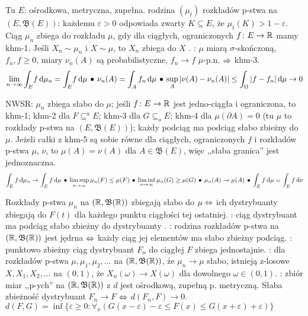 Tu  $E$: ośrodkowa, metryczna, zupełna.
 rodzina $(\mu_t)$ rozkładów p-stwa na $(E, \mathfrak B(E))$: każdemu $\varepsilon > 0$ odpowiada zwarty $K \subseteq E$, że $\mu_t(K) > 1 - \varepsilon$.
Ciąg $\mu_n$ zbiega  do rozkładu $\mu$, gdy dla ciągłych, ograniczonych $f \colon E \to \mathbb{R}$ mamy khm-1.
Jeśli $X_n \sim \mu_n$ i $X \sim \mu$, to $X_n$ zbiega do $X$ .
: $\mu$ miarą $\sigma$-skończoną, $f_n, f \ge 0$, miary $\nu_n (A)$ są probabilistyczne, $f_n \to f$ $\mu$-p.n. $\Rightarrow$ khm-3.
\[
	\lim_{n \to \infty} \int_E \! f \, \textrm{d} \mu_n = \int_E \! f \, \textrm{d} \mu \, \bullet \,
	\nu_n(A) = \int_A f_n \, \textrm{d} \mu \, \bullet \,
	\sup_A \left|\nu(A) - \nu_n(A)\right| \le \int_\Omega |f-f_n| \, \textrm{d} \mu \to 0
\]

NWSR:  $\mu_n$ zbiega słabo do $\mu$; jeśli $f \colon E \to \mathbb{R}$ jest jedno-ciągła i ograniczona, to khm-1; khm-2 dla $F \subseteq^a E$; khm-3 dla $G \subseteq_o E$; khm-4 dla $\mu (\partial A) = 0$ (tu $\mu$ to rozkłady p-stwa na $(E, \mathfrak B(E))$); każdy podciąg ma podciąg słabo zbieżny do $\mu$.
Jeżeli całki z khm-5 są sobie równe dla ciągłych, ograniczonych $f$ i rozkładów p-stwa $\mu$, $\nu$, to $\mu (A) = \nu (A)$ dla $A \in \mathfrak B(E)$, więc ,,słaba granica'' jest jednoznaczna.
\[
	\int_E f \, \textrm{d} \mu_n \to \int_E f \, \textrm{d} \mu \, \bullet \,
	\limsup_{n \to \infty} \mu_n (F) \le \mu (F) \, \bullet \,
	\liminf_{n \to \infty} \mu_n (G) \ge \mu (G) \, \bullet \,
	\mu_n(A) \to \mu(A)
	\, \bullet \, \int_E f \, \textrm{d} \mu = \int_E f \, \textrm{d} \nu
\]

Rozkłady  p-stwa $\mu_n$ na $(\mathbb{R}, \mathfrak B(\mathbb{R}))$ zbiegają słabo do $\mu \Leftrightarrow$ ich dystrybuanty zbiegają do $F(t)$ dla każdego punktu ciągłości tej ostatniej.
: ciąg dystrybuant ma podciąg słabo zbieżny do dystrybuanty .
: rodzina rozkładów p-stwa na $(\mathbb{R}, \mathfrak B(\mathbb{R}))$ jest jędrna $\Leftrightarrow$ każdy ciąg jej elementów ma słabo zbieżny podciąg.
: punktowo zbieżny ciąg dystrybuant $F_n$ do ciągłej $F$ zbiega jednostajnie.
: dla rozkładów p-stwa $\mu, \mu_1, \mu_2, \dots$ na $(\mathbb{R}, \mathfrak B(\mathbb{R}))$, że $\mu_n \to \mu$ słabo, istnieją z-losowe $X, X_1, X_2, \dots$ na $(0,1)$, że $X_n(\omega) \to X(\omega)$ dla dowolnego $\omega \in (0,1)$.
: zbiór miar ,,p-ych'' na $(\mathbb{R}, \mathfrak B(\mathbb{R}))$ z $d$ jest ośrodkową, zupełną p. metryczną.
Słaba zbieżność dystrybuant $F_n \to F$ $\Leftrightarrow$ $d(F_n, F) \to 0$.
$d(F, G) = \inf \{\varepsilon \ge 0: \forall_x (G(x-\varepsilon) - \varepsilon \le F(x) \le G(x+\varepsilon) + \varepsilon)\}$